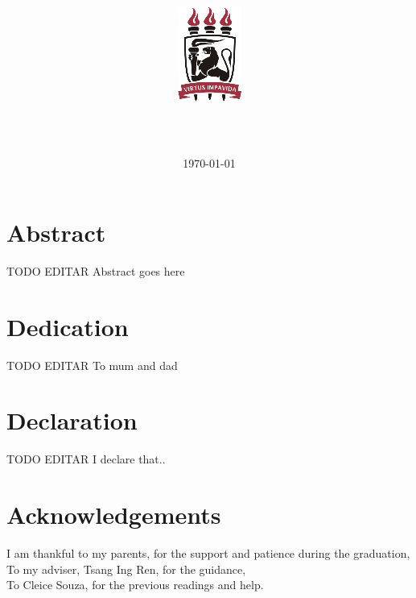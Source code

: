 \documentclass[12pt,twoside]{report}
\title{
    {\includegraphics{ufpelogo.png}}
    \\
    {\large \universityname}
    \\
    {\large \centername}
    \vfill
    \textbf{\papertitle}
    \vfill
}
\author{\authorname}
\date{\normalsize\vfill \today}%
\begin{document}
\maketitle



\chapter*{Abstract}
TODO EDITAR Abstract goes here

\chapter*{Dedication}
TODO EDITAR To mum and dad

\chapter*{Declaration}
TODO EDITAR I declare that..

\chapter*{Acknowledgements}
I am thankful to my parents, for the support and patience during the graduation,
\\To my adviser, Tsang Ing Ren, for the guidance,
\\To Cleice Souza, for the previous readings and help.

\tableofcontents



















\appendix


\printbibliography
\end{document}
